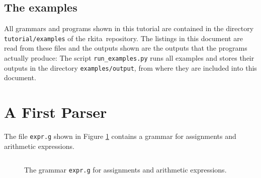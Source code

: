 \documentclass[11pt,a4paper]{article}
\makeatletter
\newcommand{\fakesc}[1]{\resizebox{!}{0.99ex}{\textls[90]{\MakeUppercase{#1}}}}
\def\@simtextsc#1#2\@nil{\MakeUppercase{#1}\fakesc{#2}}
\newcommand{\simtextsc}[1]{%
  \ifmmode\text{\@simtextsc#1\@nil}\else\@simtextsc#1\@nil\fi}
\newcommand{\Larkita}{\simtextsc{Larkita}}
\newcommand{\codefigure}[5][]{\begin{figure}[H]%
  \inputminted[numbers = left, numbersep = 0.3cm, #1]{#2}{examples/#3}%
  \vspace*{-0.3cm}%
  \caption{#5}\label{#4}\end{figure}}
\newcommand{\grammarfile}[2]{\codefigure{larkita_lexer.py:LarkitaLexer}{#1}{fig:#1}{#2}}
\makeatother
\begin{document}
\subsection{The examples}
All grammars and programs shown in this tutorial are contained in the directory \texttt{tutorial/examples}
of the \Larkita\ repository.  The listings in this document are read from these files and the outputs shown
are the outputs that the programs actually produce: The script \texttt{run\_examples.py} runs all examples
and stores their outputs in the directory \texttt{examples/output}, from where they are included into this
document.

\section{A First Parser}
\label{sec:first}
The file \texttt{expr.g} shown in Figure \ref{fig:expr.g} contains a grammar for assignments and arithmetic
expressions.
\grammarfile{expr.g}{The grammar \texttt{expr.g} for assignments and arithmetic expressions.}
\end{document}
